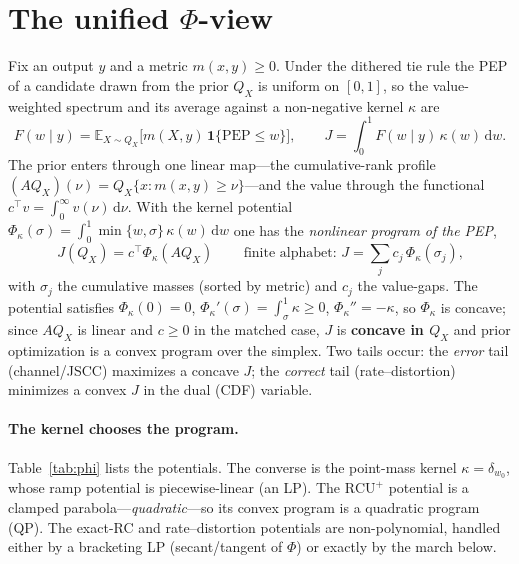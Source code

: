 \documentclass[11pt]{article}
\newcommand{\Tr}{^{\!\top}}
\begin{document}
\section{The unified $\Phi$-view}\label{sec:phi}
Fix an output $y$ and a metric $m(x,y)\ge0$. Under the dithered tie rule the PEP of a
candidate drawn from the prior $Q_X$ is uniform on $[0,1]$, so the value-weighted
spectrum and its average against a non-negative kernel $\kappa$ are
\begin{equation}
F(w\mid y)=\mathbb{E}_{X\sim Q_X}\!\big[m(X,y)\,\mathbf{1}\{\mathrm{PEP}\le w\}\big],
\qquad J=\int_0^1 F(w\mid y)\,\kappa(w)\,\mathrm{d}w .
\end{equation}
The prior enters through one linear map---the cumulative-rank profile
$(AQ_X)(\nu)=Q_X\{x: m(x,y)\ge\nu\}$---and the value through the functional
$c\Tr v=\int_0^\infty v(\nu)\,\mathrm{d}\nu$. With the kernel potential
$\Phi_\kappa(\sigma)=\int_0^1\min\{w,\sigma\}\,\kappa(w)\,\mathrm{d}w$ one has the
\emph{nonlinear program of the PEP},
\begin{equation}\label{eq:nlp}
\boxed{\,J(Q_X)=c\Tr \Phi_\kappa(AQ_X)\,}\qquad
\text{finite alphabet: } J=\sum_j c_j\,\Phi_\kappa(\sigma_j),
\end{equation}
with $\sigma_j$ the cumulative masses (sorted by metric) and $c_j$ the value-gaps.
The potential satisfies $\Phi_\kappa(0)=0$, $\Phi_\kappa'(\sigma)=\int_\sigma^1\kappa\ge0$,
$\Phi_\kappa''=-\kappa$, so $\Phi_\kappa$ is concave; since $AQ_X$ is linear and
$c\ge0$ in the matched case, $J$ is \textbf{concave in $Q_X$} and prior optimization
is a convex program over the simplex. Two tails occur: the \emph{error} tail
(channel/JSCC) maximizes a concave $J$; the \emph{correct} tail (rate--distortion)
minimizes a convex $J$ in the dual (CDF) variable.

\paragraph{The kernel chooses the program.}
Table~\ref{tab:phi} lists the potentials. The converse is the point-mass kernel
$\kappa=\delta_{w_0}$, whose ramp potential is piecewise-linear (an LP). The
$\mathrm{RCU}^+$ potential is a clamped parabola---\emph{quadratic}---so its convex
program is a quadratic program (QP). The exact-RC and rate--distortion potentials are
non-polynomial, handled either by a bracketing LP (secant/tangent of $\Phi$) or
exactly by the march below.
\end{document}
